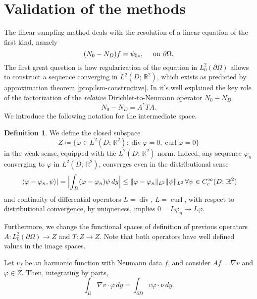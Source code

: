 \documentclass[10pt, a4paper, twoside, openright]{book}
\theoremstyle{definition}
\newtheorem{definition}[subsection]{Definition}
\theoremstyle{plain}
\theoremstyle{plain}
\theoremstyle{plain}
\theoremstyle{plain}
\theoremstyle{plain}
\theoremstyle{plain}
\theoremstyle{plain}
\theoremstyle{plain}
\DeclareMathOperator{\divergence}{div}
\DeclareMathOperator{\curl}{curl}
\let\phi\varphi
\begin{document}
\section{Validation of the methods}
\label{section:validation}
The linear sampling method deals with the resolution of a linear equation of the first kind, namely
\begin{equation}
\label{eq:NtoD_firstkind}
 ({N_0} - {N_D}) f = \psi_{0z},\quad \textup{ on }\partial \Omega.
\end{equation}
The first great question is how regularization of the equation in $L^2_0(\partial \Omega)$
allows to construct a sequence converging in $L^2(D;\,\mathbb{R}^2)$, which exists as predicted by approximation theorem \ref{prop:lsm-constructive}.
In \cite{arens:why} it's well explained the key role of the factorization 
of the \textit{relative} Dirichlet-to-Neumann operator ${N_0} - {N_D}$
\begin{equation}
 {N_0} - {N_D} = A^*TA.
\end{equation}
We introduce the following notation for the intermediate space.
\begin{definition}
We define the closed subspace
\begin{equation}
 Z\coloneqq\bigl\{\phi\in L^2(D;\,\mathbb{R}^2):\divergence\phi=0, \curl\phi=0\bigr\}
\end{equation}
in the weak sense, equipped with the $L^2(D;\,\mathbb{R}^2)$ norm. Indeed, any sequence $\phi_n$ converging to $\phi$ in $L^2(D;\,\mathbb{R}^2)$, converges even in the distributional sense
\begin{equation}
 |\langle\phi-\phi_n, \psi\rangle|=\Bigl|\int_D(\phi-\phi_n)\psi\,dy\Bigr|\leq\|\phi - \phi_n\|_{L^2}\|\psi\|_{L^2}\, \forall\psi\in C^\infty_c(D;\,\mathbb{R}^2)
\end{equation}
and continuity of differential operators $L=\divergence$, $L=\curl$, with respect to distributional convergence, by uniqueness, implies $0=L\phi_n\to L\phi$.
\par 
Furthermore, we change the functional spaces of definition of previous operators $A:L^2_0(\partial \Omega)\to Z$ and $T:Z \to Z$. 
Note that both operators have well defined values in the image spaces.
\end{definition}
Let $v_f$ be an harmonic function with Neumann data $f$, and consider $Af=\nabla v$ and $\phi\in Z$. Then, integrating by parts,
\begin{equation}
 \int_D\nabla v\cdot \phi\,dy=\int_{\partial D}v \phi\cdot\nu\,dy.
\end{equation}
\end{document}
